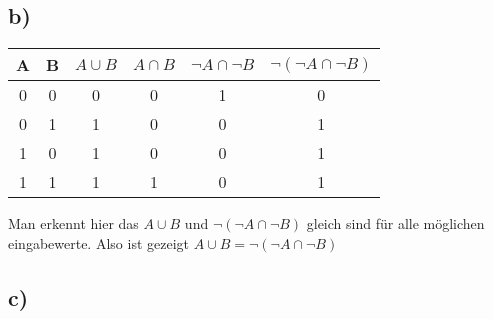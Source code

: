 \documentclass{article}
\begin{document}
\subsection*{b)}
    \begin{center}
        \begin{tabular}{|c|c|c|c|c|c|}
        \hline
        A & B & \(A \cup B\) & \(A \cap B\) & \(\neg A \cap \neg B\) & \(\neg (\neg A \cap \neg B)\) \\
        \hline
        0 & 0 & 0 & 0 & 1 & 0 \\
        \hline
        0 & 1 & 1 & 0 & 0 & 1 \\
        \hline
        1 & 0 & 1 & 0 & 0 & 1 \\
        \hline
        1 & 1 & 1 & 1 & 0 & 1 \\
        \hline
        \end{tabular}
    \end{center}
    Man erkennt hier das \(A \cup B\) und \(\neg (\neg A \cap \neg B)\) gleich sind für alle möglichen eingabewerte. Also ist gezeigt \(A \cup B = \neg (\neg A \cap \neg B)\)
    
\subsection*{c)}
\end{document}
